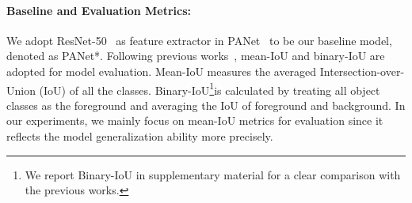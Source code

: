 \documentclass[runningheads]{llncs}
\begin{document}
\paragraph{{\rm \textbf{Baseline and Evaluation Metrics:}}} We adopt ResNet-50~\cite{he2016deep} as feature extractor in PANet~\cite{wang2019panet} to be our baseline model, denoted as PANet*. 
Following previous works~\cite{boots2017one,zhang2018sg,rakelly2018conditional,wang2019panet,zhang2019pyramid}, mean-IoU and binary-IoU are adopted for model evaluation.  Mean-IoU measures the averaged Intersection-over-Union (IoU) of all the classes. Binary-IoU\footnote{We report Binary-IoU in supplementary material for a clear comparison with the previous works.}is calculated by treating all object classes as the foreground and averaging the IoU of foreground and background. In our experiments, we mainly focus on mean-IoU metrics for evaluation since it reflects the model generalization ability more precisely.
\end{document}
